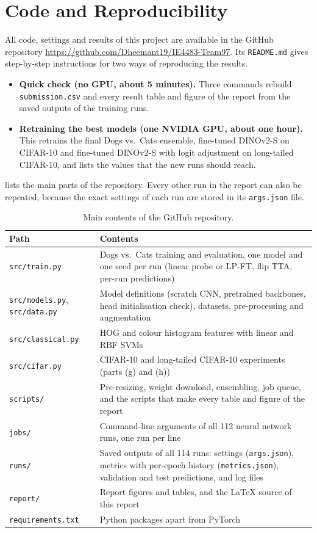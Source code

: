 \documentclass[11pt,a4paper]{article}
\newcommand{\repo}{\url{https://github.com/Dheemant19/IE4483-Team97}}
\begin{document}
\section{Code and Reproducibility}\label{app:run}

All code, settings and results of this project are available in the GitHub repository \repo. Its \texttt{README.md} gives step-by-step instructions for two ways of reproducing the results.
\begin{itemize}
  \item \textbf{Quick check (no GPU, about 5 minutes).} Three commands rebuild \texttt{submission.csv} and every result table and figure of the report from the saved outputs of the training runs.
  \item \textbf{Retraining the best models (one NVIDIA GPU, about one hour).} This retrains the final Dogs vs.\ Cats ensemble, fine-tuned DINOv2-S on CIFAR-10 and fine-tuned DINOv2-S with logit adjustment on long-tailed CIFAR-10, and lists the values that the new runs should reach.
\end{itemize}
 lists the main parts of the repository. Every other run in the report can also be repeated, because the exact settings of each run are stored in its \texttt{args.json} file.

\begin{table}[ht]
  \centering
  \small
  \caption{Main contents of the GitHub repository.}
  \label{tab:repo}
  \begin{tabularx}{\textwidth}{@{}l >{\raggedright\arraybackslash}X@{}}
    \toprule
    Path & Contents \\
    \midrule
    \texttt{src/train.py} & Dogs vs.\ Cats training and evaluation, one model and one seed per run (linear probe or LP-FT, flip TTA, per-run predictions) \\
    \texttt{src/models.py}, \texttt{src/data.py} & Model definitions (scratch CNN, pretrained backbones, head initialisation check), datasets, pre-processing and augmentation \\
    \texttt{src/classical.py} & HOG and colour histogram features with linear and RBF SVMs \\
    \texttt{src/cifar.py} & CIFAR-10 and long-tailed CIFAR-10 experiments (parts (g) and (h)) \\
    \texttt{scripts/} & Pre-resizing, weight download, ensembling, job queue, and the scripts that make every table and figure of the report \\
    \texttt{jobs/} & Command-line arguments of all 112 neural network runs, one run per line \\
    \texttt{runs/} & Saved outputs of all 114 runs: settings (\texttt{args.json}), metrics with per-epoch history (\texttt{metrics.json}), validation and test predictions, and log files \\
    \texttt{report/} & Report figures and tables, and the LaTeX source of this report \\
    \texttt{requirements.txt} & Python packages apart from PyTorch \\
    \bottomrule
  \end{tabularx}
\end{table}
\end{document}
